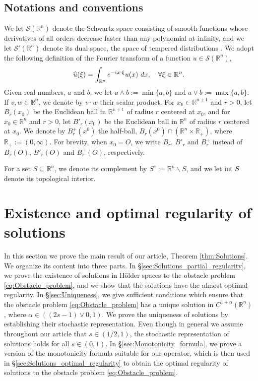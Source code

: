 \documentclass[11pt,reqno]{amsart}
\theoremstyle{definition}
\theoremstyle{remark}
\begin{document}
\subsection{Notations and conventions}
\label{subsec:Notation}
We let ${{\mathcal{S}}}({\mathbb{R}}^n)$ denote the Schwartz space \cite[Definition (3.3.3)]{Taylor_vol1} consisting of smooth functions whose
derivatives of all orders decrease faster than any polynomial at infinity, and we let ${{\mathcal{S}}}'({\mathbb{R}}^n)$ denote its dual space, the space of tempered distributions \cite[\S 3.4]{Taylor_vol1}. We adopt the following definition of the Fourier transform  of a function $u\in{{\mathcal{S}}}({\mathbb{R}}^n)$,
$$
\widehat u (\xi) = \int_{{\mathbb{R}}^n} e^{-ix{\hbox{$\cdot$}}\xi} u(x)\ dx,\quad\forall \xi\in{\mathbb{R}}^n.
$$
Given real numbers, $a$ and $b$, we let $a \wedge b:=\min\{a,b\}$ and $a \vee b:=\max\{a,b\}$. If $v,w\in{\mathbb{R}}^n$, we denote by $v\cdot w$ their scalar product. For $x_0\in{\mathbb{R}}^{n+1}$ and $r>0$, let $B_r(x_0)$ be the Euclidean ball in ${\mathbb{R}}^{n+1}$ of radius $r$ centered at $x_0$, and for $x_0\in{\mathbb{R}}^n$ and $r>0$, let $B'_r(x_0)$ be the Euclidean ball in ${\mathbb{R}}^n$ of radius $r$ centered at $x_0$. We denote by $B^+_r(x^0)$ the half-ball, $B_r(x^0)\cap\left({\mathbb{R}}^{n}\times{\mathbb{R}}_+\right)$, where ${\mathbb{R}}_+:=(0,\infty)$. For brevity, when $x_0=O$, we write $B_r$, $B'_r$ and $B^+_r$ instead of $B_r(O)$, $B'_r(O)$ and $B^+_r(O)$, respectively. 

For a set $S\subseteq{\mathbb{R}}^n$, we denote its complement by $S^c:={\mathbb{R}}^n\backslash S$, and we let $\hbox{int } S$ denote its topological interior.

\section{Existence and optimal regularity of solutions}
\label{sec:Solutions}
In this section we prove the main result of our article, Theorem \ref{thm:Solutions}. We organize its content into three parts. In \S \ref{sec:Solutions_partial_regularity}, we prove the existence of solutions in H\"older spaces to the obstacle problem \eqref{eq:Obstacle_problem}, and we show that the solutions have the almost optimal regularity. In \S \ref{sec:Uniqueness}, we give sufficient conditions which ensure that the obstacle problem \eqref{eq:Obstacle_problem} has a unique solution in $C^{1+\alpha}({\mathbb{R}}^n)$, where $\alpha\in ((2s-1)\vee 0,1)$. We prove the uniqueness of solutions by establishing their stochastic representation. Even though in general we assume throughout our article that $s\in (1/2,1)$, the stochastic representation of solutions holds for all $s\in (0,1)$. In \S \ref{sec:Monotonicity_formula}, we prove a version of the monotonicity formula suitable for our operator, which is then used in \S \ref{sec:Solutions_optimal_regularity} to obtain the optimal regularity of solutions to the obstacle problem \eqref{eq:Obstacle_problem}.
\end{document}
